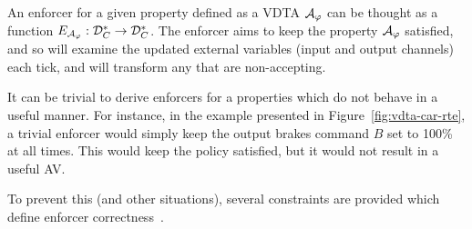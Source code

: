 An enforcer for a given property defined as a VDTA ${\mathcal A}_\varphi$ can be thought as a function $E_{{\mathcal A}_\varphi}:{{\mathcal D}}_{C}^* \rightarrow {{\mathcal D}}_{C}^*$. 
The enforcer aims to keep the property ${\mathcal A}_\varphi$ satisfied, and so will examine the updated external variables (input and output channels) each tick, and will transform any that are non-accepting.

It can be trivial to derive enforcers for a properties which do not behave in a useful manner.
For instance, in the example presented in Figure~\ref{fig:vdta-car-rte}, a trivial enforcer would simply keep the output brakes command $B$ set to 100\% at all times.
This would keep the policy satisfied, but it would not result in a useful \ac{AV}.

To prevent this (and other situations), several constraints are provided which define enforcer correctness~\cite{RuntimeEnforcementOfCPS}.


